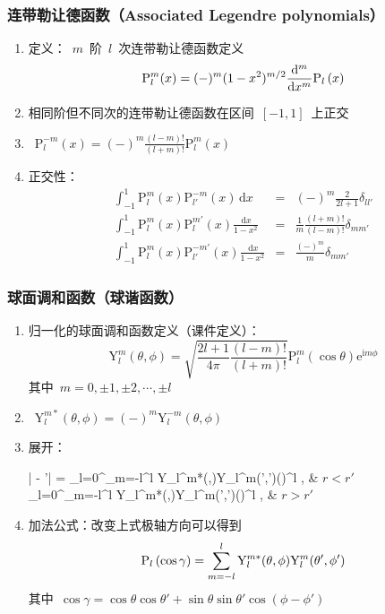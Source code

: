 \documentclass[12pt,a4paper]{article}
\newcommand\dif{\mathrm{d}}
\newcommand\diff{\,\mathrm{d}}
\renewcommand*{\vec}[1]{\bm{#1}}%
\renewcommand{\[}{\ $\displaystyle}
\renewcommand{\]}{$\ }%
\newcommand\mi{\mathrm{i}}
\newcommand\e{\mathrm{e}}
\begin{document}
	  \subsubsection{连带勒让德函数（Associated Legendre polynomials）}
	    \begin{enumerate}
	    	\item 定义：\[m\]阶\[l\]次连带勒让德函数定义
	    		$$
	    		  \mathrm{P}_l^m(x) = (-)^m (1-x^2)^{m/2}\frac{\dif ^m}{\dif x^m}\fp{x}
	    		$$
	    	\item 相同阶但不同次的连带勒让德函数在区间\[[-1,1]\]上正交
	    	\item \[\mathrm{P}_l^{-m}(x) = (-)^m\frac{(l-m)!}{(l+m)!}\mathrm{P}_l^m(x)\]
	    	\item 正交性：
	    	\begin{eqnarray*}
	    	\int_{-1}^1\mathrm{P}_l^m(x)\mathrm{P}_{l'}^{-m}(x)\diff x &=& (-)^m\frac{2}{2l+1}\delta_{ll'} \\
	    	\int_{-1}^1\mathrm{P}_l^m(x)\mathrm{P}_{l}^{m'}(x)\frac{\diff x}{1-x^2} &=& \frac{1}{m}\frac{(l+m)!}{(l-m)!}\delta_{mm'} \\
	    	\int_{-1}^1\mathrm{P}_l^m(x)\mathrm{P}_{l'}^{-m'}(x)\frac{\diff x}{1-x^2} &=& \frac{(-)^m}{m}\delta_{mm'}
	    	\end{eqnarray*}
	    \end{enumerate}
	    
	  \subsubsection{球面调和函数（球谐函数）}
	    \begin{enumerate}
	     \item 归一化的球面调和函数定义（课件定义）：
	     	$$
	     	  \mathrm{Y}_l^m(\theta,\phi) = \sqrt{\frac{2l+1}{4\pi}\frac{(l-m)!}{(l+m)!}}\mathrm{P}_l^m(\cos\theta)\e^{\mi m\phi}
	     	$$
	     	其中\[m = 0,\pm 1 , \pm 2 , \cdots ,\pm l\]
	     \item \[\mathrm Y_l^{m*}(\theta,\phi) = (-)^m\mathrm Y_l^{-m}(\theta,\phi)\]
	     \item 展开：
	      	  	\begin{numcases}{ {|\vec r - \vec r'|} = }
	      	  		\sum_{l=0}^\infty \sum_{m=-l}^l  \mathrm Y_l^{m*}(\theta,\phi)\mathrm Y_l^m(\theta',\phi')\left(\right)^l , & $r<r'$ \nonumber\\
	      	  		\sum_{l=0}^\infty \sum_{m=-l}^l \mathrm Y_l^{m*}(\theta,\phi)\mathrm Y_l^m(\theta',\phi')\left(\right)^l , & $r>r'$ \nonumber
	      	  	\end{numcases}
	     \item 加法公式：改变上式极轴方向可以得到
	     	$$
	     	  \mathrm{P}_{l}\left(\cos\gamma\right) = \sum_{m=-l}^l \mathrm Y_l^{m*}(\theta,\phi)\mathrm Y_l^m(\theta',\phi')
	     	$$
	     	其中\[\cos \gamma = \cos \theta \cos \theta' + \sin \theta \sin \theta' \cos (\phi - \phi')\]
	    \end{enumerate}	      
	      
\end{document}
